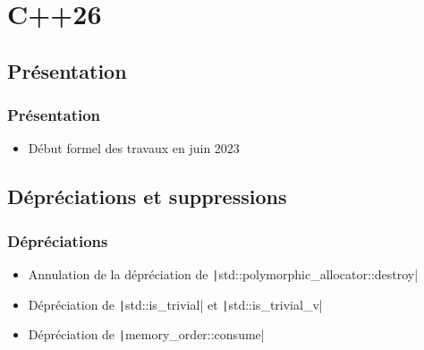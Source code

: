 \documentclass[C++.tex]{subfiles}
\begin{document}
\section{C++26}
\subsection*{Présentation}
\begin{frame}
	\frametitle{Présentation}
	\begin{itemize}
		\item Début formel des travaux en juin 2023
	\end{itemize}
\end{frame}

\subsection*{Dépréciations et suppressions}
\begin{frame}[fragile]
	\frametitle{Dépréciations}
	\begin{itemize}
		\item Annulation de la dépréciation de \texttt|std::polymorphic_allocator::destroy|
		\item Dépréciation de \texttt|std::is_trivial| et \texttt|std::is_trivial_v|
		\item Dépréciation de \texttt|memory_order::consume|
	\end{itemize}

\end{frame}
\end{document}
